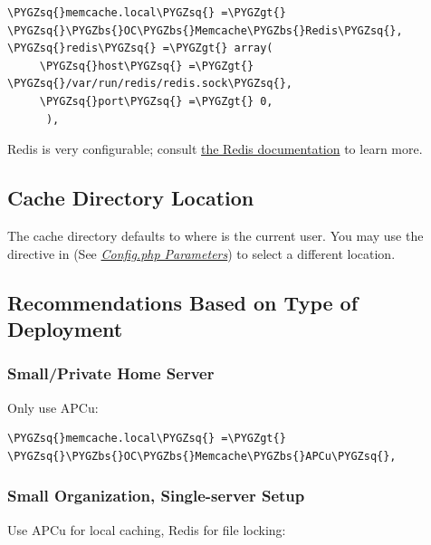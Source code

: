\documentclass[letterpaper,10pt,english]{sphinxmanual}
\def\PYGZbs{\char`\\}
\def\PYGZgt{\char`\>}
\def\PYGZsq{\char`\'}
\renewcommand\PYGZsq{\textquotesingle}
\begin{document}
\begin{Verbatim}[commandchars=\\\{\}]
\PYGZsq{}memcache.local\PYGZsq{} =\PYGZgt{} \PYGZsq{}\PYGZbs{}OC\PYGZbs{}Memcache\PYGZbs{}Redis\PYGZsq{},
\PYGZsq{}redis\PYGZsq{} =\PYGZgt{} array(
     \PYGZsq{}host\PYGZsq{} =\PYGZgt{} \PYGZsq{}/var/run/redis/redis.sock\PYGZsq{},
     \PYGZsq{}port\PYGZsq{} =\PYGZgt{} 0,
      ),
\end{Verbatim}

Redis is very configurable; consult \href{http://redis.io/documentation}{the Redis documentation} to learn more.


\subsection{Cache Directory Location}
\label{configuration_server/caching_configuration:cache-directory-location}
The cache directory defaults to  where  is the
current user. You may use the  directive in 
(See {\hyperref[configuration_server/config_sample_php_parameters::doc]{\emph{\emph{Config.php Parameters}}}}) to select a different location.


\subsection{Recommendations Based on Type of Deployment}
\label{configuration_server/caching_configuration:recommendations-based-on-type-of-deployment}

\subsubsection{Small/Private Home Server}
\label{configuration_server/caching_configuration:small-private-home-server}
Only use APCu:

\begin{Verbatim}[commandchars=\\\{\}]
\PYGZsq{}memcache.local\PYGZsq{} =\PYGZgt{} \PYGZsq{}\PYGZbs{}OC\PYGZbs{}Memcache\PYGZbs{}APCu\PYGZsq{},
\end{Verbatim}


\subsubsection{Small Organization, Single-server Setup}
\label{configuration_server/caching_configuration:small-organization-single-server-setup}
Use APCu for local caching, Redis for file locking:
\end{document}
